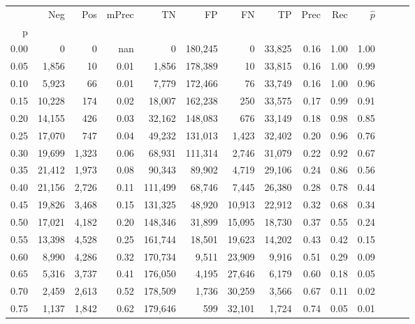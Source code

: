 \begin{tabular}{rrrrrrrrrrrrrr}
\toprule
{} &     Neg &    Pos & mPrec &       TN &       FP &      FN &      TP &  Prec &   Rec & $\hat{p}$ \\
p    &         &        &       &          &          &         &         &       &       &           \\
\midrule
0.00 &       0 &      0 &   nan &        0 &  180,245 &       0 &  33,825 &  0.16 &  1.00 &      1.00 \\
0.05 &   1,856 &     10 &  0.01 &    1,856 &  178,389 &      10 &  33,815 &  0.16 &  1.00 &      0.99 \\
0.10 &   5,923 &     66 &  0.01 &    7,779 &  172,466 &      76 &  33,749 &  0.16 &  1.00 &      0.96 \\
0.15 &  10,228 &    174 &  0.02 &   18,007 &  162,238 &     250 &  33,575 &  0.17 &  0.99 &      0.91 \\
0.20 &  14,155 &    426 &  0.03 &   32,162 &  148,083 &     676 &  33,149 &  0.18 &  0.98 &      0.85 \\
0.25 &  17,070 &    747 &  0.04 &   49,232 &  131,013 &   1,423 &  32,402 &  0.20 &  0.96 &      0.76 \\
0.30 &  19,699 &  1,323 &  0.06 &   68,931 &  111,314 &   2,746 &  31,079 &  0.22 &  0.92 &      0.67 \\
0.35 &  21,412 &  1,973 &  0.08 &   90,343 &   89,902 &   4,719 &  29,106 &  0.24 &  0.86 &      0.56 \\
0.40 &  21,156 &  2,726 &  0.11 &  111,499 &   68,746 &   7,445 &  26,380 &  0.28 &  0.78 &      0.44 \\
0.45 &  19,826 &  3,468 &  0.15 &  131,325 &   48,920 &  10,913 &  22,912 &  0.32 &  0.68 &      0.34 \\
0.50 &  17,021 &  4,182 &  0.20 &  148,346 &   31,899 &  15,095 &  18,730 &  0.37 &  0.55 &      0.24 \\
0.55 &  13,398 &  4,528 &  0.25 &  161,744 &   18,501 &  19,623 &  14,202 &  0.43 &  0.42 &      0.15 \\
0.60 &   8,990 &  4,286 &  0.32 &  170,734 &    9,511 &  23,909 &   9,916 &  0.51 &  0.29 &      0.09 \\
0.65 &   5,316 &  3,737 &  0.41 &  176,050 &    4,195 &  27,646 &   6,179 &  0.60 &  0.18 &      0.05 \\
0.70 &   2,459 &  2,613 &  0.52 &  178,509 &    1,736 &  30,259 &   3,566 &  0.67 &  0.11 &      0.02 \\
0.75 &   1,137 &  1,842 &  0.62 &  179,646 &      599 &  32,101 &   1,724 &  0.74 &  0.05 &      0.01 \\

\end{tabular}

